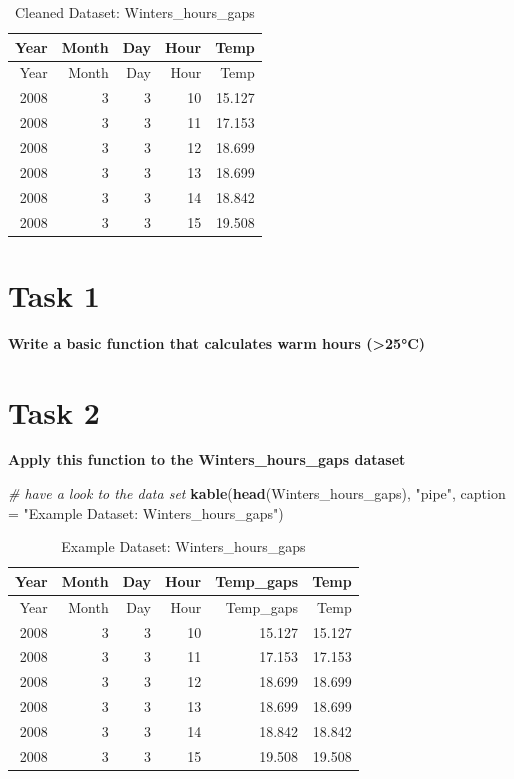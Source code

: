 \documentclass[
]{book}
\newenvironment{Shaded}{\begin{snugshade}}{\end{snugshade}}
\newcommand{\CommentTok}[1]{\textcolor[rgb]{0.56,0.35,0.01}{\textit{#1}}}
\newcommand{\ControlFlowTok}[1]{\textcolor[rgb]{0.13,0.29,0.53}{\textbf{#1}}}
\newcommand{\DataTypeTok}[1]{\textcolor[rgb]{0.13,0.29,0.53}{#1}}
\newcommand{\FloatTok}[1]{\textcolor[rgb]{0.00,0.00,0.81}{#1}}
\newcommand{\KeywordTok}[1]{\textcolor[rgb]{0.13,0.29,0.53}{\textbf{#1}}}
\newcommand{\NormalTok}[1]{#1}
\newcommand{\OperatorTok}[1]{\textcolor[rgb]{0.81,0.36,0.00}{\textbf{#1}}}
\newcommand{\StringTok}[1]{\textcolor[rgb]{0.31,0.60,0.02}{#1}}
\begin{document}
\begin{longtable}[]{@{}rrrrr@{}}
\caption{\label{tab:unnamed-chunk-4}Cleaned Dataset: Winters\_hours\_gaps}\tabularnewline
\toprule
Year & Month & Day & Hour & Temp\tabularnewline
\midrule
\endfirsthead
\toprule
Year & Month & Day & Hour & Temp\tabularnewline
\midrule
\endhead
2008 & 3 & 3 & 10 & 15.127\tabularnewline
2008 & 3 & 3 & 11 & 17.153\tabularnewline
2008 & 3 & 3 & 12 & 18.699\tabularnewline
2008 & 3 & 3 & 13 & 18.699\tabularnewline
2008 & 3 & 3 & 14 & 18.842\tabularnewline
2008 & 3 & 3 & 15 & 19.508\tabularnewline
\bottomrule
\end{longtable}

\hypertarget{task-1-2}{%
\section{Task 1}\label{task-1-2}}

\textbf{Write a basic function that calculates warm hours (\textgreater25°C)}

\begin{Shaded}
\end{Shaded}

\hypertarget{task-2-2}{%
\section{Task 2}\label{task-2-2}}

\textbf{Apply this function to the Winters\_hours\_gaps dataset}

\begin{Shaded}
\begin{Highlighting}[]
\CommentTok{# have a look to the data set}
\KeywordTok{kable}\NormalTok{(}\KeywordTok{head}\NormalTok{(Winters_hours_gaps), }
      \StringTok{"pipe"}\NormalTok{, }\DataTypeTok{caption =} 
        \StringTok{"Example Dataset: Winters_hours_gaps"}\NormalTok{) }
\end{Highlighting}
\end{Shaded}

\begin{longtable}[]{@{}rrrrrr@{}}
\caption{\label{tab:unnamed-chunk-6}Example Dataset: Winters\_hours\_gaps}\tabularnewline
\toprule
Year & Month & Day & Hour & Temp\_gaps & Temp\tabularnewline
\midrule
\endfirsthead
\toprule
Year & Month & Day & Hour & Temp\_gaps & Temp\tabularnewline
\midrule
\endhead
2008 & 3 & 3 & 10 & 15.127 & 15.127\tabularnewline
2008 & 3 & 3 & 11 & 17.153 & 17.153\tabularnewline
2008 & 3 & 3 & 12 & 18.699 & 18.699\tabularnewline
2008 & 3 & 3 & 13 & 18.699 & 18.699\tabularnewline
2008 & 3 & 3 & 14 & 18.842 & 18.842\tabularnewline
2008 & 3 & 3 & 15 & 19.508 & 19.508\tabularnewline
\bottomrule
\end{longtable}
\end{document}

